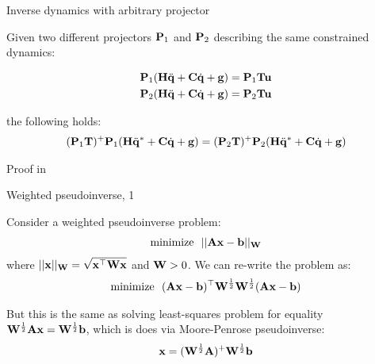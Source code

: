 \documentclass{beamer}
\begin{document}
\begin{frame}{Inverse dynamics with arbitrary projector}
	\begin{flushleft}
		
		Given two different projectors $\mathbf{P}_1$ and $\mathbf{P}_2$ describing the same constrained dynamics:
		
		\begin{align}
			\mathbf{P}_1(\mathbf{H}\ddot{\mathbf{q}} + \mathbf{C}\dot{\mathbf{q}}+ \mathbf{g}) = \mathbf{P}_1\mathbf{T}\mathbf{u}
			\\
			\mathbf{P}_2(\mathbf{H}\ddot{\mathbf{q}} + \mathbf{C}\dot{\mathbf{q}}+ \mathbf{g}) = \mathbf{P}_2\mathbf{T}\mathbf{u}
		\end{align}		
		
		the following holds:
		\begin{align}
			(\mathbf{P}_1\mathbf{T})^+\mathbf{P}_1(\mathbf{H}\ddot{\mathbf{q}}^* + \mathbf{C}\dot{\mathbf{q}}+ \mathbf{g})
			=
			(\mathbf{P}_2\mathbf{T})^+\mathbf{P}_2(\mathbf{H}\ddot{\mathbf{q}}^* + \mathbf{C}\dot{\mathbf{q}}+ \mathbf{g})
		\end{align}		
		
		\bigskip
		
		Proof in 
		
	\end{flushleft}
\end{frame}




\begin{frame}{Weighted pseudoinverse, 1}
	\begin{flushleft}
		
		Consider a weighted pseudoinverse problem:
		\begin{align}
			\text{minimize} \ \ ||\mathbf{A}\mathbf{x}-\mathbf{b}||_{\mathbf{W}}
		\end{align}		
	where $||\mathbf{x}||_{\mathbf{W}} = \sqrt{\mathbf{x}^\top\mathbf{W}\mathbf{x}}$ and $\mathbf{W} > 0$. We can re-write the problem as:
	\begin{align}
		\text{minimize} \ \ (\bo{A}\bo{x}-\bo{b})\T\bo{W}^\frac{1}{2}\bo{W}^\frac{1}{2}(\bo{A}\bo{x}-\bo{b})
	\end{align}
	
	But this is the same as solving least-squares problem for equality $\mathbf{W}^\frac{1}{2}\mathbf{A}\mathbf{x}=\mathbf{W}^\frac{1}{2}\mathbf{b}$, which is does via Moore-Penrose pseudoinverse:
	\begin{align}
		\mathbf{x}=(\mathbf{W}^\frac{1}{2}\mathbf{A})^+\mathbf{W}^\frac{1}{2}\mathbf{b}
	\end{align}
	
	\end{flushleft}
\end{frame}
\end{document}

